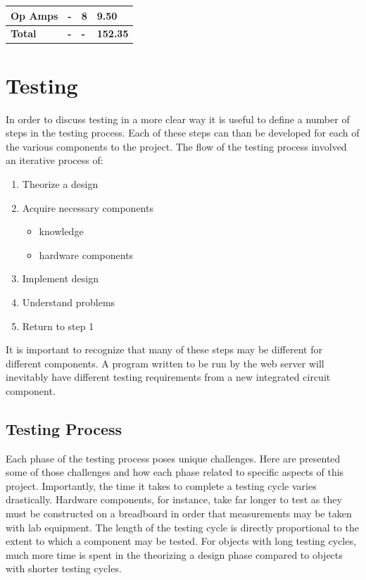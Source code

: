 \documentclass{article}	%
\begin{document}
\begin{multicols}{2}
\begin{center}
\begin{tabularx}{0.4\textwidth}{|X|X|X|X|}
        \textbf{Op Amps} &
        \textbf{-} &
        \textbf{8} &
        \textbf{9.50} \\
        \hline

        \textbf{Total} &
        \textbf{-} &
        \textbf{-} &
        \textbf{152.35} \\

        \hline
    \end{tabularx}
\end{center}

\section{Testing}
In order to discuss testing in a more clear way
it is useful to define a number of steps
in the testing process.
Each of these steps can than be developed for
each of the various components to the project.
%
The flow of the testing process
involved an iterative process of:
\begin{enumerate}
\item Theorize a design
\item Acquire necessary components
    \begin{itemize}
    \item knowledge
    \item hardware components
    \end{itemize}
\item Implement design
\item Understand problems
\item Return to step 1
\end{enumerate}
%
It is important to recognize that many
of these steps may be different for different components.
A program written to be run by the web server
will inevitably have different testing requirements from
a new integrated circuit component.

\subsection{Testing Process}
Each phase of the testing process poses unique challenges.
Here are presented some of those challenges and
how each phase related to specific aspects of this project.
Importantly, the time it takes to complete a 
testing cycle varies drastically.
Hardware components, for instance, take far longer to test
as they must be constructed on a breadboard in order that 
measurements may be taken with lab equipment.
%
The length of the testing cycle is 
directly proportional to the extent to
which a component may be tested.
%
For objects with long testing cycles,
much more time is spent in the 
theorizing a design phase compared to
objects with shorter testing cycles.


\end{multicols}
\end{document}
